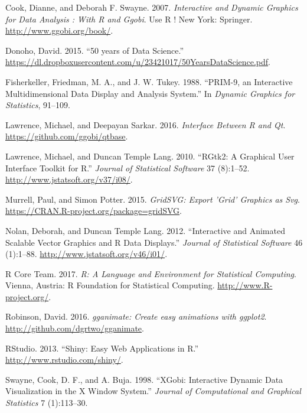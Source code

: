 \documentclass[12pt,]{article}
\theoremstyle{definition}
\theoremstyle{definition}
\theoremstyle{definition}
\theoremstyle{remark}
\begin{document}
\leavevmode\hypertarget{ref-ggobi:2007}{}%
Cook, Dianne, and Deborah F. Swayne. 2007. \emph{Interactive and Dynamic
Graphics for Data Analysis : With R and Ggobi}. Use R ! New York:
Springer. \url{http://www.ggobi.org/book/}.

\leavevmode\hypertarget{ref-Donoho:2015tu}{}%
Donoho, David. 2015. ``50 years of Data Science.''
\url{https://dl.dropboxusercontent.com/u/23421017/50YearsDataScience.pdf}.

\leavevmode\hypertarget{ref-PRIM9}{}%
Fisherkeller, Friedman, M. A., and J. W. Tukey. 1988. ``PRIM-9, an
Interactive Multidimensional Data Display and Analysis System.'' In
\emph{Dynamic Graphics for Statistics}, 91--109.

\leavevmode\hypertarget{ref-qtbase}{}%
Lawrence, Michael, and Deepayan Sarkar. 2016. \emph{Interface Between R
and Qt}. \url{https://github.com/ggobi/qtbase}.

\leavevmode\hypertarget{ref-RGtk2}{}%
Lawrence, Michael, and Duncan Temple Lang. 2010. ``RGtk2: A Graphical
User Interface Toolkit for R.'' \emph{Journal of Statistical Software}
37 (8):1--52. \url{http://www.jstatsoft.org/v37/i08/}.

\leavevmode\hypertarget{ref-gridSVG}{}%
Murrell, Paul, and Simon Potter. 2015. \emph{GridSVG: Export 'Grid'
Graphics as Svg}. \url{https://CRAN.R-project.org/package=gridSVG}.

\leavevmode\hypertarget{ref-SVGAnnotation}{}%
Nolan, Deborah, and Duncan Temple Lang. 2012. ``Interactive and Animated
Scalable Vector Graphics and R Data Displays.'' \emph{Journal of
Statistical Software} 46 (1):1--88.
\url{http://www.jstatsoft.org/v46/i01/}.

\leavevmode\hypertarget{ref-RCore}{}%
R Core Team. 2017. \emph{R: A Language and Environment for Statistical
Computing}. Vienna, Austria: R Foundation for Statistical Computing.
\url{http://www.R-project.org/}.

\leavevmode\hypertarget{ref-gganimate}{}%
Robinson, David. 2016. \emph{gganimate: Create easy animations with
ggplot2}. \url{http://github.com/dgrtwo/gganimate}.

\leavevmode\hypertarget{ref-shiny}{}%
RStudio. 2013. ``Shiny: Easy Web Applications in R.''
\url{http://www.rstudio.com/shiny/}.

\leavevmode\hypertarget{ref-xgobi}{}%
Swayne, Cook, D. F., and A. Buja. 1998. ``XGobi: Interactive Dynamic
Data Visualization in the X Window System.'' \emph{Journal of
Computational and Graphical Statistics} 7 (1):113--30.
\end{document}
